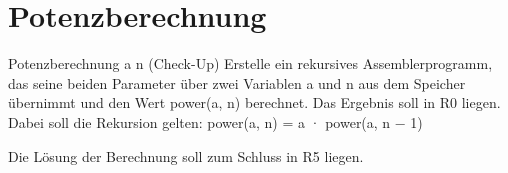 \documentclass{lehramt-informatik-aufgabe}
\begin{document}
\section{Potenzberechnung}

Potenzberechnung a n (Check-Up)
Erstelle ein rekursives Assemblerprogramm, das seine beiden Parameter über zwei
Variablen a und n aus dem Speicher übernimmt und den Wert power(a, n) berechnet.
Das Ergebnis soll in R0 liegen. Dabei soll die Rekursion gelten:
power(a, n) = a · power(a, n − 1)

Die Lösung der Berechnung soll zum Schluss in R5 liegen.
\end{document}
